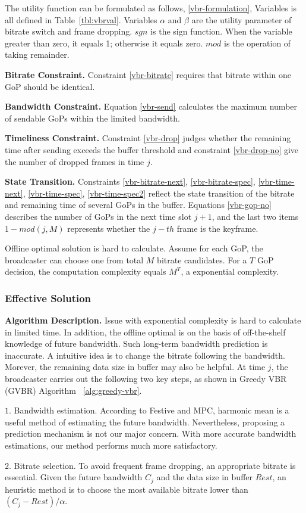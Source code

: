 The utility function can be formulated as follows, \ref{vbr-formulation}, Variables is all defined in Table~\ref{tbl:vbrval}. Variables $\alpha$ and $\beta$ are the utility parameter of bitrate switch and frame dropping. $sgn$ is the sign function. When the variable greater than zero, it equals 1; otherwise it equals zero. $mod$ is the operation of taking remainder.

\textbf{Bitrate Constraint.} Constraint \ref{vbr-bitrate} requires that bitrate within one GoP should be identical.

\textbf{Bandwidth Constraint.} Equation \ref{vbr-send} calculates the maximum number of sendable GoPs within the limited bandwidth.

\textbf{Timeliness Constraint.} Constraint \ref{vbr-drop} judges whether the remaining time after sending exceeds the buffer threshold and constraint \ref{vbr-drop-no} give the number of dropped frames in time $j$.

\textbf{State Transition.} Constraints \ref{vbr-bitrate-next}, \ref{vbr-bitrate-spec}, \ref{vbr-time-next}, \ref{vbr-time-spec}, \ref{vbr-time-spec2} reflect the state transition of the bitrate and remaining time of several GoPs in the buffer. Equations \ref{vbr-gop-no} describes the number of GoPs in the next time slot $j+1$, and the last two items $1-mod(j,M)$ represents whether the $j-th$ frame is the keyframe.

Offline optimal solution is hard to calculate. Assume for each GoP, the broadcaster can choose one from total $M$ bitrate candidates. For a $T$ GoP decision, the computation complexity equals $M^T$, a exponential complexity.

\subsubsection{Effective Solution}

\textbf{Algorithm Description.} Issue with exponential complexity is hard to calculate in limited time. In addition, the offline optimal is on the basis of off-the-shelf knowledge of future bandwidth. Such long-term bandwidth prediction is inaccurate. A intuitive idea is to change the bitrate following the bandwidth. Morever, the remaining data size in buffer may also be helpful. At time $j$, the broadcaster carries out the following two key steps, as shown in Greedy VBR (GVBR) Algorithm ~\ref{alg:greedy-vbr}.

$1.$ Bandwidth estimation. According to Festive and MPC, harmonic mean is a useful method of estimating the future bandwidth. Nevertheless, proposing a prediction mechanism is not our major concern. With more accurate bandwidth estimations, our method performs much more satisfactory.

$2.$ Bitrate selection. To avoid frequent frame dropping, an appropriate bitrate is essential. Given the future bandwidth $C_j$ and the data size in buffer $Rest$, an heuristic method is to choose the most available bitrate lower than $(C_j-Rest)/\alpha$.
